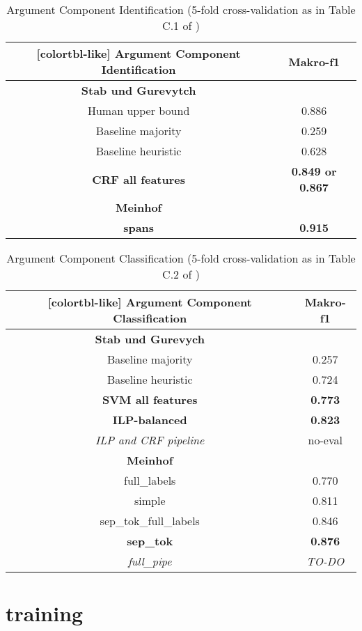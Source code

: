 \documentclass[12]{article}
\newcommand\T{\rule{0pt}{3.5ex}}       %
\newcommand\I{\rule[-1.25ex]{0pt}{0pt}} %
\newcommand\B{\rule[-2.0ex]{0pt}{0pt}} %
\theoremstyle{mytheoremstyle}
\theoremstyle{mytheoremstyle}
\theoremstyle{myproblemstyle}
\begin{document}
  \begin{table}[!h]
    \centering
    \begin{NiceTabular}{c|c}[colortbl-like]
      \large\textbf{Argument Component Identification} &  \large\textbf{Makro-f1}\\ 
      \hline
      \hline
      \textbf{Stab und Gurevytch}& \T \I \\
      Human upper bound & 0.886\\
      Baseline majority & 0.259\\
      Baseline heuristic & 0.628\\
      \textbf{CRF all features} & \textbf{0.849 or 0.867}\B\\
      \hline
      \textbf{Meinhof} & \T \I \\
      \textbf{spans} & \textbf{0.915}\\ 
    \end{NiceTabular}
    \caption{Argument Component Identification (5-fold cross-validation as in Table C.1 of \cite{stab-gurevych-2017-parsing})}
    \label{tab:ident_f1}
  \end{table}

  \begin{table}[!h]
    \centering
    \begin{NiceTabular}{c|c}[colortbl-like]
      \large\textbf{Argument Component Classification} &  \large\textbf{Makro-f1}\\
      \hline
      \hline
      \textbf{Stab und Gurevych} & \T \I \\
      Baseline majority & 0.257\\
      Baseline heuristic & 0.724\\
      \textbf{SVM all features} & \textbf{0.773}\\
      \textbf{ILP-balanced} & \textbf{0.823}\\
      \textit{ILP and CRF pipeline} & no-eval \B \\
      \hline
      \textbf{Meinhof} & \T \I \\
      full\_labels & 0.770\\
      simple & 0.811\\
      sep\_tok\_full\_labels & 0.846\\
      \textbf{sep\_tok} & \textbf{0.876}\\
      \textit{full\_pipe} & \textit{TO-DO}\\

    \end{NiceTabular}
    \caption{Argument Component Classification (5-fold cross-validation as in Table C.2 of \cite{stab-gurevych-2017-parsing})}
    \label{tab:class_f1}
  \end{table}

  \section{training\dotfill}
  \newpage
  
  
\end{document}
